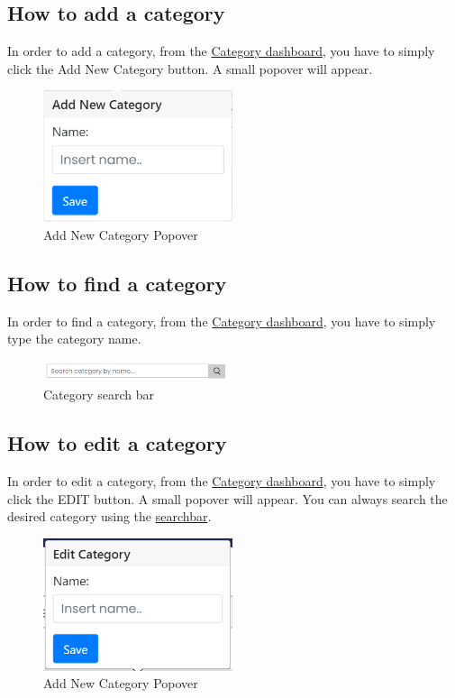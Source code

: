 \subsection{How to add a category}\label{_addCategory}
In order to add a category, from the \hyperref[_categorymanagement]{Category dashboard}, you have to simply click the Add New Category button.
A small popover will appear.
\begin{figure}[H]
    \centering
    \includegraphics[width=15em]{res/images/venditore/addcategorypopover.png}
    \caption{Add New Category Popover}
\end{figure}

\subsection{How to find a category}\label{_findCategory}
In order to find a category, from the \hyperref[_categorymanagement]{Category dashboard}, you have to simply type the category name.
\begin{figure}[H]
    \centering
    \includegraphics[width=15em]{res/images/venditore/categorysearchbar.png}
    \caption{Category search bar}
\end{figure}

\subsection{How to edit a category}\label{_editCategory}
In order to edit a category, from the \hyperref[_categorymanagement]{Category dashboard}, you have to simply click the EDIT button.
A small popover will appear.
You can always search the desired category using the \hyperref[_findCategory]{searchbar}.
\begin{figure}[H]    \includegraphics[width=15em]{res/images/venditore/editcategorypopover.png}

    \centering
    \caption{Add New Category Popover}
\end{figure}

